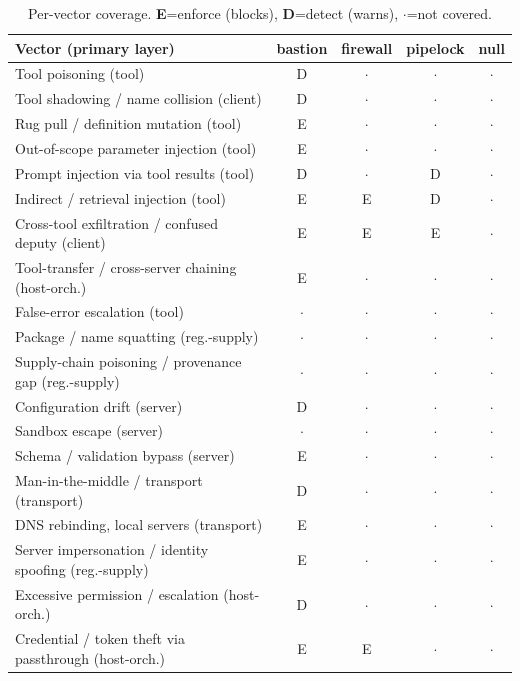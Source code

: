 \documentclass[11pt]{article}
\begin{document}
\begin{table}[t]
\centering
\caption{Per-vector coverage. \textbf{E}=enforce (blocks), \textbf{D}=detect (warns), $\cdot$=not covered.}
\label{tab:matrix}
\scriptsize
\begin{tabularx}{\linewidth}{@{}Xcccc@{}}
\toprule
Vector (primary layer) & bastion & firewall & pipelock & null \\
\midrule
Tool poisoning (tool) & D & $\cdot$ & $\cdot$ & $\cdot$ \\
Tool shadowing / name collision (client) & D & $\cdot$ & $\cdot$ & $\cdot$ \\
Rug pull / definition mutation (tool) & E & $\cdot$ & $\cdot$ & $\cdot$ \\
Out-of-scope parameter injection (tool) & E & $\cdot$ & $\cdot$ & $\cdot$ \\
Prompt injection via tool results (tool) & D & $\cdot$ & D & $\cdot$ \\
Indirect / retrieval injection (tool) & E & E & D & $\cdot$ \\
Cross-tool exfiltration / confused deputy (client) & E & E & E & $\cdot$ \\
Tool-transfer / cross-server chaining (host-orch.) & E & $\cdot$ & $\cdot$ & $\cdot$ \\
False-error escalation (tool) & $\cdot$ & $\cdot$ & $\cdot$ & $\cdot$ \\
Package / name squatting (reg.-supply) & $\cdot$ & $\cdot$ & $\cdot$ & $\cdot$ \\
Supply-chain poisoning / provenance gap (reg.-supply) & $\cdot$ & $\cdot$ & $\cdot$ & $\cdot$ \\
Configuration drift (server) & D & $\cdot$ & $\cdot$ & $\cdot$ \\
Sandbox escape (server) & $\cdot$ & $\cdot$ & $\cdot$ & $\cdot$ \\
Schema / validation bypass (server) & E & $\cdot$ & $\cdot$ & $\cdot$ \\
Man-in-the-middle / transport (transport) & D & $\cdot$ & $\cdot$ & $\cdot$ \\
DNS rebinding, local servers (transport) & E & $\cdot$ & $\cdot$ & $\cdot$ \\
Server impersonation / identity spoofing (reg.-supply) & E & $\cdot$ & $\cdot$ & $\cdot$ \\
Excessive permission / escalation (host-orch.) & D & $\cdot$ & $\cdot$ & $\cdot$ \\
Credential / token theft via passthrough (host-orch.) & E & E & $\cdot$ & $\cdot$ \\

\end{tabularx}
\end{table}
\end{document}
